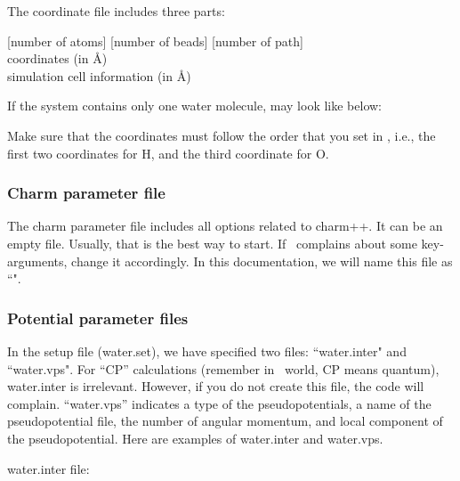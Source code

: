 The coordinate file includes three parts:

[number of atoms] [number of beads] [number of path]\\
coordinates (in \AA)\\
simulation cell information (in \AA)

If the system contains only one water molecule, {\selectfont{water.coords\_initial}} may look like below:

{\selectfont{
3 1 1\\
0.757 0.586 0.0\\
-0.757 0.586 0.0\\
0.000 0.000 0.0\\
10 0 0\\
0 10 0\\
0 0 10\\
}}

Make sure that the coordinates must follow the order that you set in {\selectfont{water.set}}, i.e., the first two coordinates for H, and the third coordinate for O. 

\subsubsection{Charm parameter file}

The charm parameter file includes all options related to charm++. It can be an empty file. Usually, that is the best way to start. If  \openatom \ complains about some key-arguments, change it accordingly. In this documentation, we will name this file as ``{\selectfont{cpaimd\_config}}".


\subsubsection{Potential parameter files}

In the setup file (water.set), we have specified two files: ``water.inter" and ``water.vps". For ``CP'' calculations (remember in \openatom \ world, CP means quantum), water.inter is irrelevant. However, if you do not create this file, the code will complain. ``water.vps'' indicates a type of the pseudopotentials, a name of the pseudopotential file, the number of angular momentum, and local component of the pseudopotential. Here are examples of water.inter and water.vps.

water.inter file:

